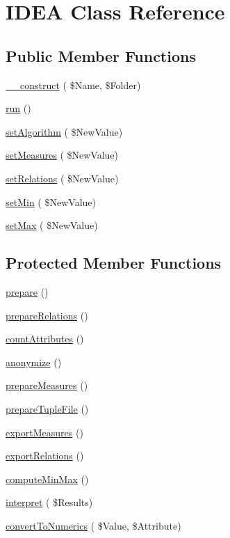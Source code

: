 \hypertarget{class_i_d_e_a}{}\section{I\+D\+EA Class Reference}
\label{class_i_d_e_a}
\subsection*{Public Member Functions}
\begin{DoxyCompactItemize}
\item 
\hyperlink{class_i_d_e_a_a619c0adf618521a0c77c02e401289f67}{\+\_\+\+\_\+construct} ( \$Name, \$Folder)
\item 
\hyperlink{class_i_d_e_a_ab5c7cf60f5cc2ae3bb7d77a36933bb61}{run} ()
\item 
\hyperlink{class_i_d_e_a_a0114e10dc4b11caf8767c313b9064cf4}{set\+Algorithm} ( \$New\+Value)
\item 
\hyperlink{class_i_d_e_a_ae05dbe1a15345145bb193a9cc859f97a}{set\+Measures} ( \$New\+Value)
\item 
\hyperlink{class_i_d_e_a_af72fb5120db8911ae3a6efb68d73a908}{set\+Relations} ( \$New\+Value)
\item 
\hyperlink{class_i_d_e_a_a7ada7c59e4920dd9fa811543c18804bc}{set\+Min} ( \$New\+Value)
\item 
\hyperlink{class_i_d_e_a_a9f0c13679c4db79e3eb349779a2d7859}{set\+Max} ( \$New\+Value)
\end{DoxyCompactItemize}
\subsection*{Protected Member Functions}
\begin{DoxyCompactItemize}
\item 
\hyperlink{class_i_d_e_a_af5672e1fd95ed4bacd0922478a3317f2}{prepare} ()
\item 
\hyperlink{class_i_d_e_a_a7b775135905a443175ab2b6c7c4a7503}{prepare\+Relations} ()
\item 
\hyperlink{class_i_d_e_a_a09cc11c30c9ceafd4a2d74e1cadd96ef}{count\+Attributes} ()
\item 
\hyperlink{class_i_d_e_a_a9a426f6b9d366062c75ec915612129b0}{anonymize} ()
\item 
\hyperlink{class_i_d_e_a_a236cabd79a85f11694d1a3fd2506a64b}{prepare\+Measures} ()
\item 
\hyperlink{class_i_d_e_a_ac163b213929ce738cb4a85a2d867a287}{prepare\+Tuple\+File} ()
\item 
\hyperlink{class_i_d_e_a_ab64af10966c41b17649bfc1e9ac1fad5}{export\+Measures} ()
\item 
\hyperlink{class_i_d_e_a_a4bb32a8d3fd43d598db825f0e8dd556d}{export\+Relations} ()
\item 
\hyperlink{class_i_d_e_a_aa5be6c475fac729b2933e6c42757e6b3}{compute\+Min\+Max} ()
\item 
\hyperlink{class_i_d_e_a_a56633ba474df66fc6073aa4757097145}{interpret} ( \$Results)
\item 
\hyperlink{class_i_d_e_a_ac7c5dda1b31f66cb02e09d22d1dbf1e5}{convert\+To\+Numerics} ( \$Value, \$Attribute)
\end{DoxyCompactItemize}

